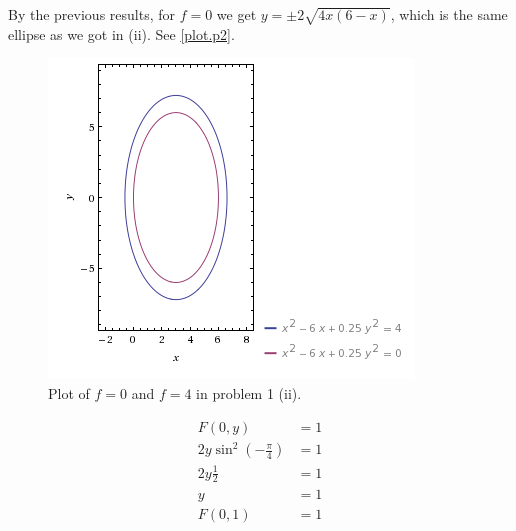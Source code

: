 \documentclass[a4paper,norsk,12pt]{article}
\begin{document}
By the previous results, for $f=0$ we get $y = \pm 2\sqrt{4x(6-x)}$, which is
the same ellipse as we got in (ii). See \vref{plot.p2}.

\begin{figure}[htp]
  \centering
  \includegraphics{ob1plot2.png}
  \caption{Plot of $f=0$ and $f=4$ in problem 1 (ii).}
  \label{plot.p2}
\end{figure}










\begin{align*}
  F(0,y) &= 1 \\
  2y \sin^2(-\frac{\pi}{4}) &= 1 \\
  2y\frac{1}{2} &= 1 \\
  y &= 1 \\
  F(0,1) &= 1
\end{align*}
\end{document}

